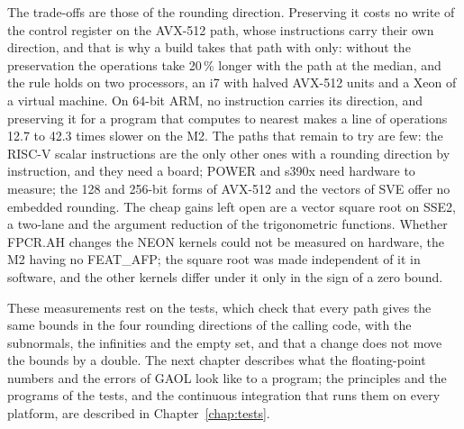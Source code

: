 \medskip
The trade-offs are those of the rounding direction. Preserving it costs
no write of the control register on the AVX-512 path, whose instructions carry their own direction,
and that is why a build takes that path with 
only: without the preservation the operations take 20\,\% longer with the path at the median, and the
rule holds on two processors, an i7 with halved AVX-512 units and a Xeon of a virtual machine. On 64-bit ARM, no
instruction carries its direction, and preserving it for a program that
computes to nearest makes a line of operations 12.7 to 42.3 times slower on the M2. The paths that remain to try are few: the RISC-V scalar
instructions are the only other ones with a rounding direction by
instruction, and they need a board; POWER and s390x need hardware to
measure; the 128 and 256-bit forms of AVX-512 and the vectors of SVE offer
no embedded rounding. The cheap gains left open are a vector square root on
SSE2, a two-lane  and the argument reduction of the
trigonometric functions. Whether FPCR.AH changes the NEON kernels could not
be measured on hardware, the M2 having no FEAT\_AFP; the square root was made independent of it in software, and the other kernels differ under it only in the sign of a zero bound.

\medskip
These measurements rest on the tests, which check that every path gives the
same bounds in the four rounding directions of the calling code, with the
subnormals, the infinities and the empty set, and that a change does not
move the bounds by a double. The next chapter describes what the floating-point
numbers and the errors of GAOL look like to a program; the principles
and the programs of the tests, and the continuous integration that runs them
on every platform, are described in Chapter~\ref{chap:tests}.
